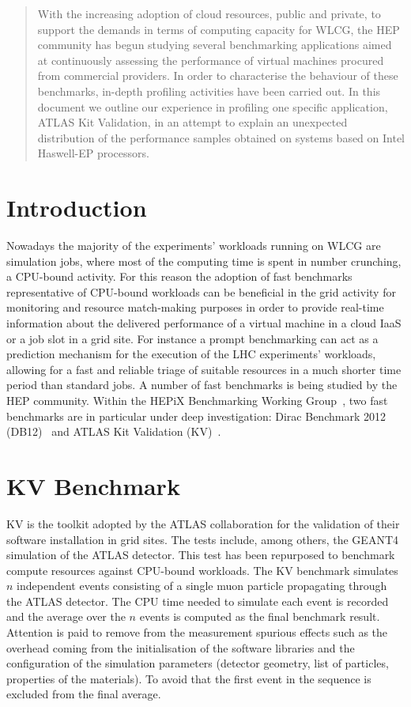 \begin{abstract}
With the increasing adoption of cloud resources, public and private, to support
the demands in terms of computing capacity for WLCG, the HEP community has begun
studying several benchmarking applications aimed at continuously assessing the
performance of virtual machines procured from commercial providers.
In order to characterise the behaviour of these benchmarks, in-depth
profiling activities have been carried out. In this document we outline
our experience in profiling one specific application, ATLAS Kit Validation,
in an attempt to explain an unexpected distribution of the performance samples
obtained on systems based on Intel Haswell-EP processors.
\end{abstract}


\section{Introduction}

Nowadays the majority of the experiments' workloads running on WLCG are simulation jobs, where most of the computing time is spent in number crunching, a CPU-bound activity. For this reason the adoption of fast benchmarks representative of CPU-bound workloads can be beneficial in the grid activity for monitoring and resource match-making purposes in order to  provide real-time information about the delivered performance of a virtual machine in a cloud IaaS or a job slot in a grid site.
For instance a prompt benchmarking can  act as a prediction mechanism for the execution of the LHC experiments' workloads, allowing for a fast and reliable triage of suitable resources in a much shorter time period than standard jobs.
%
A number of fast benchmarks is being studied by the HEP community. Within the HEPiX Benchmarking Working Group~\cite{HEPiX:2014:HEPiX}, two fast benchmarks are in particular under deep investigation: Dirac Benchmark 2012 (DB12)~\cite{CERN:2016:DB12} and ATLAS Kit Validation (KV)~\cite{KV}.

\section{KV Benchmark}

KV is the toolkit adopted by the ATLAS collaboration for the
validation of their software installation in grid sites. The tests include, among
others, the GEANT4~\cite{GEANT4} simulation of the ATLAS detector. 
This test has been repurposed to benchmark compute resources against CPU-bound workloads. 
The KV benchmark simulates
$n$ independent events consisting of a single muon particle propagating through
the ATLAS detector.  The CPU time needed to simulate each event is recorded and the average over the $n$ events is computed as the final benchmark result.
Attention is paid to remove  from the measurement spurious effects such as the overhead coming from the initialisation of the
software libraries and the configuration of the simulation parameters (detector
geometry, list of particles, properties of the materials). To avoid that the first event in the sequence is excluded from the final average.

